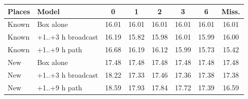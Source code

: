\begin{tabular}{|l|p{2.1cm}|c|c|c|c|c|c|}
\hline
Places & Model & 0 & 1 & 2 & 3 & 6 & Miss. \\
\hline
Known & Box alone & 16.01 & 16.01 & 16.01 & 16.01 & 16.01 & 16.01 \\
Known & +1..+3 h broadcast & 16.19 & 15.82 & 15.98 & 16.01 & 15.99 & 16.00 \\
Known & +1..+9 h path & 16.68 & 16.19 & 16.12 & 15.99 & 15.73 & 15.42 \\
New & Box alone & 17.48 & 17.48 & 17.48 & 17.48 & 17.48 & 17.48 \\
New & +1..+3 h broadcast & 18.22 & 17.33 & 17.46 & 17.36 & 17.38 & 17.38 \\
New & +1..+9 h path & 18.59 & 17.93 & 17.84 & 17.72 & 17.39 & 16.59 \\
\hline
\end{tabular}
